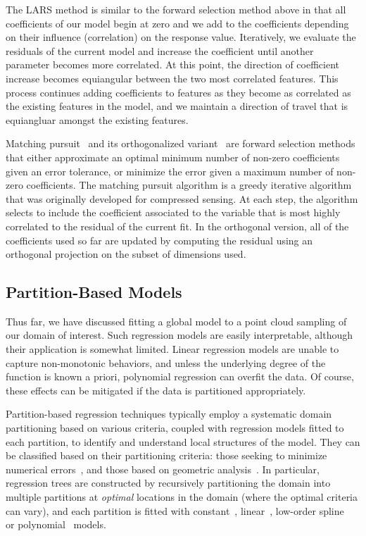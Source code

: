 The LARS method is similar to the forward selection method above in that all coefficients of our model begin at zero and we add to the coefficients depending on their influence (correlation) on the response value.
%
Iteratively, we evaluate the residuals of the current model and increase the coefficient until another parameter becomes more correlated.
%
At this point, the direction of coefficient increase becomes equiangular between the two most correlated features.
%
This process continues adding coefficients to features as they become as correlated as the existing features in the model,
and we maintain a direction of travel that is equiangluar amongst the existing features.

Matching pursuit~\cite{MallatZhang1993} and its orthogonalized variant~\cite{DavisMallatZhang1994,PatiRezaiifarKrishnaprasad1993} are forward selection methods that either approximate an optimal minimum number of non-zero coefficients given an error tolerance, or minimize the error given a maximum number of non-zero coefficients.
%
The matching pursuit algorithm is a greedy iterative algorithm that was originally developed for compressed sensing.
%
At each step, the algorithm selects to include the coefficient associated to the variable that is most highly correlated to the residual of the current fit.
%
In the orthogonal version, all of the coefficients used so far are updated by computing the residual using an orthogonal projection on the subset of dimensions used.

\subsection{Partition-Based Models}
Thus far, we have discussed fitting a global model to a point cloud sampling of our domain of interest.
%
Such regression models are easily interpretable, although their application is somewhat limited.
%
Linear regression models are unable to capture non-monotonic behaviors, and unless the underlying degree of the function is known a priori, polynomial regression can overfit the data.
%
Of course, these effects can be mitigated if the data is partitioned appropriately.

Partition-based regression techniques typically employ a systematic domain partitioning based on various criteria, coupled with regression models fitted to each partition, to identify and understand local structures of the model.
%
They can be classified based on their partitioning criteria: those seeking to minimize numerical errors~\cite{Friedman1991,AlexanderGrimshaw1996,BreimanFriedmanOlshen1984a,ChaudhuriHuangLoh1994,ChipmanMcCulloch2010}, and those based on geometric analysis~\cite{GerberPotter2012,GerberRubelBremer2011,LiLueChen2000}.
%
In particular, regression trees are constructed by recursively partitioning the domain into multiple partitions at \emph{optimal} locations in the domain (where the optimal criteria can vary), and each partition is fitted with constant~\cite{BreimanFriedmanOlshen1984a}, linear~\cite{AlexanderGrimshaw1996,LiLueChen2000}, low-order spline~\cite{Friedman1991} or polynomial~\cite{ChaudhuriHuangLoh1994} models.

